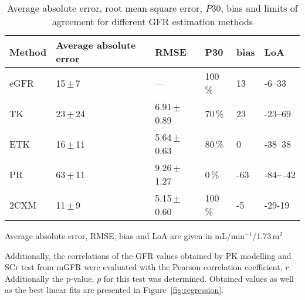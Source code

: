 \begin{table}[H]
\centering
\caption[Comparison of different GFR estimation methods]{Average absolute error, root mean square error, $P30$, bias and limits of agreement for different GFR estimation methods} 
\label{tab:results2}
\begin{threeparttable}
\renewcommand{\arraystretch}{1.5}
\begin{tabular}{l R{2.5cm} R{2.5cm}  R{2cm} R{2cm} R{2cm}}
	\toprule

	\textbf{Method} & \textbf{Average absolute error}  & \textbf{RMSE}    & \textbf{P30}   & \textbf{bias} & \textbf{LoA} \\ \toprule
				eGFR  & 		15\,$\pm$\,7     		 	 & ---  				&	100\,\%      &  13  & -6--33 \\
				 TK   & 		23\,$\pm$\,24    			 & 6.91\,$\pm$\,0.89		        & 	70\,\%       & 23   &  -23--69 \\
				ETK   & 		16\,$\pm$\,11     			 & 5.64\,$\pm$\,0.63			        &	80\,\%       &0    & -38--38\\
				 PR   & 		63\,$\pm$\,11     			 & 9.26\,$\pm$\,1.27				        &	  0\,\%      & -63  & -84--\,-42\\
			    2CXM  & 		11\,$\pm$\,9     		     & 5.15\,$\pm$\,0.60				        &	  100\,\%      &  -5  & -29-19\\
				

  	\bottomrule

\end{tabular}
\begin{tablenotes}%
\footnotesize{}%
\item Average absolute error, RMSE, bias and LoA are given in mL/min$^{-1}$/1.73\,m$^2$
    \end{tablenotes}
	\end{threeparttable}
\end{table}


Additionally, the correlations of the GFR values obtained by PK modelling and SCr test from mGFR were evaluated with the Pearson correlation coefficient, $r$. Additionally the p-value, $p$ for this test was determined. Obtained values as well as the best linear fits are presented in Figure~\ref{fig:regression}.  
\newpage

